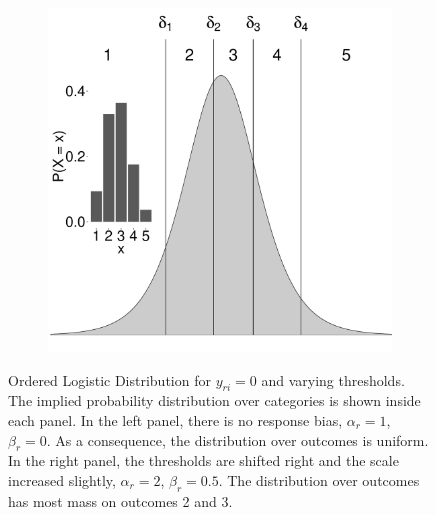 \documentclass{article}
\newcommand{\Irater}{r}
\newcommand{\Iitem}{i}
\begin{document}
\begin{figure}[!ht]
\begin{subfigure}{.5\textwidth}
		\includegraphics[width=.98\textwidth]{figures/orderedLogisticBiased.pdf}
	\end{subfigure}
	\caption{Ordered Logistic Distribution for $y_{\Irater\Iitem} = 0$ and varying thresholds. The implied probability distribution over categories is shown inside each panel. In the left panel, there is no response bias, $\alpha_\Irater = 1$, $\beta_\Irater = 0$. As a consequence, the distribution over outcomes is uniform. In the right panel, the thresholds are shifted right and the scale increased slightly, $\alpha_\Irater = 2$, $\beta_\Irater = 0.5$. The distribution over outcomes has most mass on outcomes 2 and 3.}
	\label{fig:orderedLogistic}
\end{figure}
\end{document}
